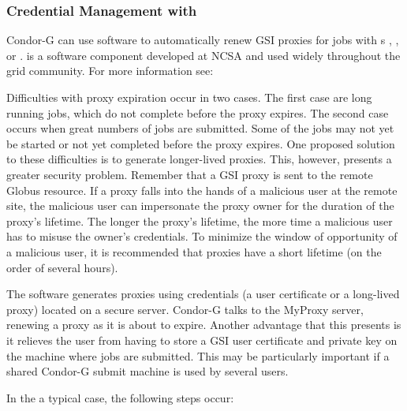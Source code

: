 \subsubsection{\label{sec:My-Proxy}Credential Management with }
Condor-G can use 
software to automatically renew GSI proxies for
 jobs with s
,
,
or
.
 is a software component developed at
NCSA and used widely throughout the grid community.
For more information see:

Difficulties with proxy expiration occur in two cases.
The first case are long running jobs, which do not complete
before the proxy expires.
The second case occurs when great numbers of jobs are submitted.
Some of the jobs may not yet be started
or not yet completed before the proxy expires.
One proposed solution to these difficulties is to generate
longer-lived proxies.
This, however, presents a greater security problem.
Remember that a GSI proxy is sent to the remote Globus resource.
If a proxy falls into the hands of a malicious user at the remote site,
the malicious user can impersonate the proxy owner
for the duration of the proxy's lifetime.
The longer the proxy's lifetime,
the more time a malicious user has to misuse the owner's credentials.
To minimize the
window of opportunity of a
malicious user, 
it is recommended that proxies have a short lifetime
(on the order of several hours).

The  software generates proxies using credentials
(a user certificate or a long-lived proxy) located on a secure
 server.
Condor-G talks to the MyProxy server,
renewing a proxy as it is about to expire.
Another advantage that this presents is it relieves the user
from having to store a GSI user certificate and private key
on the machine where jobs are submitted.
This may be particularly important if a shared Condor-G
submit machine is used by several users.

In the a typical case, the following steps occur:

